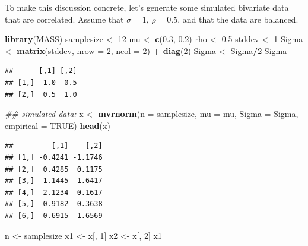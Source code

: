 \documentclass[12pt,]{krantz}
\newenvironment{Shaded}{\begin{snugshade}}{\end{snugshade}}
\newcommand{\CommentTok}[1]{\textcolor[rgb]{0.56,0.35,0.01}{\textit{#1}}}
\newcommand{\DataTypeTok}[1]{\textcolor[rgb]{0.13,0.29,0.53}{#1}}
\newcommand{\DecValTok}[1]{\textcolor[rgb]{0.00,0.00,0.81}{#1}}
\newcommand{\FloatTok}[1]{\textcolor[rgb]{0.00,0.00,0.81}{#1}}
\newcommand{\KeywordTok}[1]{\textcolor[rgb]{0.13,0.29,0.53}{\textbf{#1}}}
\newcommand{\NormalTok}[1]{#1}
\newcommand{\OperatorTok}[1]{\textcolor[rgb]{0.81,0.36,0.00}{\textbf{#1}}}
\newcommand{\OtherTok}[1]{\textcolor[rgb]{0.56,0.35,0.01}{#1}}
\newcommand{\StringTok}[1]{\textcolor[rgb]{0.31,0.60,0.02}{#1}}
\begin{document}
To make this discussion concrete, let's generate some simulated bivariate data that are correlated. Assume that \(\sigma = 1\),
\(\rho=0.5\), and that the data are balanced.

\begin{Shaded}
\begin{Highlighting}[]
\KeywordTok{library}\NormalTok{(MASS)}
\NormalTok{samplesize <-}\StringTok{ }\DecValTok{12}
\NormalTok{mu <-}\StringTok{ }\KeywordTok{c}\NormalTok{(}\FloatTok{0.3}\NormalTok{, }\FloatTok{0.2}\NormalTok{)}
\NormalTok{rho <-}\StringTok{ }\FloatTok{0.5}
\NormalTok{stddev <-}\StringTok{ }\DecValTok{1}
\NormalTok{Sigma <-}\StringTok{ }\KeywordTok{matrix}\NormalTok{(stddev, }\DataTypeTok{nrow =} \DecValTok{2}\NormalTok{, }\DataTypeTok{ncol =} \DecValTok{2}\NormalTok{) }\OperatorTok{+}\StringTok{ }
\StringTok{  }\KeywordTok{diag}\NormalTok{(}\DecValTok{2}\NormalTok{)}
\NormalTok{Sigma <-}\StringTok{ }\NormalTok{Sigma}\OperatorTok{/}\DecValTok{2}
\NormalTok{Sigma}
\end{Highlighting}
\end{Shaded}

\begin{verbatim}
##      [,1] [,2]
## [1,]  1.0  0.5
## [2,]  0.5  1.0
\end{verbatim}

\begin{Shaded}
\begin{Highlighting}[]
\CommentTok{## simulated data:}
\NormalTok{x <-}\StringTok{ }\KeywordTok{mvrnorm}\NormalTok{(}\DataTypeTok{n =}\NormalTok{ samplesize, }\DataTypeTok{mu =}\NormalTok{ mu, }\DataTypeTok{Sigma =}\NormalTok{ Sigma, }
  \DataTypeTok{empirical =} \OtherTok{TRUE}\NormalTok{)}
\KeywordTok{head}\NormalTok{(x)}
\end{Highlighting}
\end{Shaded}

\begin{verbatim}
##         [,1]    [,2]
## [1,] -0.4241 -1.1746
## [2,]  0.4285  0.1175
## [3,] -1.1445 -1.6417
## [4,]  2.1234  0.1617
## [5,] -0.9182  0.3638
## [6,]  0.6915  1.6569
\end{verbatim}

\begin{Shaded}
\begin{Highlighting}[]
\NormalTok{n <-}\StringTok{ }\NormalTok{samplesize}
\NormalTok{x1 <-}\StringTok{ }\NormalTok{x[, }\DecValTok{1}\NormalTok{]}
\NormalTok{x2 <-}\StringTok{ }\NormalTok{x[, }\DecValTok{2}\NormalTok{]}
\NormalTok{x1}
\end{Highlighting}
\end{Shaded}
\end{document}
